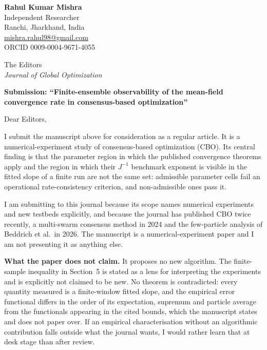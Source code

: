 \documentclass[10.5pt,a4paper]{article}
\begin{document}
\noindent
\textbf{Rahul Kumar Mishra}\\
Independent Researcher\\
Ranchi, Jharkhand, India\\
\url{mishra.rahul98@gmail.com}\\
ORCID 0009-0004-9671-4055

\vspace{0.9em}
\noindent
The Editors\\
\textit{Journal of Global Optimization}

\vspace{0.9em}
\noindent
\textbf{Submission: ``Finite-ensemble observability of the mean-field convergence rate in consensus-based optimization''}

\vspace{0.6em}
\noindent
Dear Editors,

I submit the manuscript above for consideration as a regular article. It is a numerical-experiment study of consensus-based optimization (CBO). Its central finding is that the parameter region in which the published convergence theorems apply and the region in which their $J^{-1}$ benchmark exponent is visible in the fitted slope of a finite run are not the same set: admissible parameter cells fail an operational rate-consistency criterion, and non-admissible ones pass it.

I am submitting to this journal because its scope names numerical experiments and new testbeds explicitly, and because the journal has published CBO twice recently, a multi-swarm consensus method in 2024 and the few-particle analysis of Beddrich et al.\ in 2026. The manuscript is a numerical-experiment paper and I am not presenting it as anything else.

\textbf{What the paper does not claim.} It proposes no new algorithm. The finite-sample inequality in Section~5 is stated as a lens for interpreting the experiments and is explicitly not claimed to be new. No theorem is contradicted: every quantity measured is a finite-window fitted slope, and the empirical error functional differs in the order of its expectation, supremum and particle average from the functionals appearing in the cited bounds, which the manuscript states and does not paper over. If an empirical characterisation without an algorithmic contribution falls outside what the journal wants, I would rather learn that at desk stage than after review.
\end{document}
